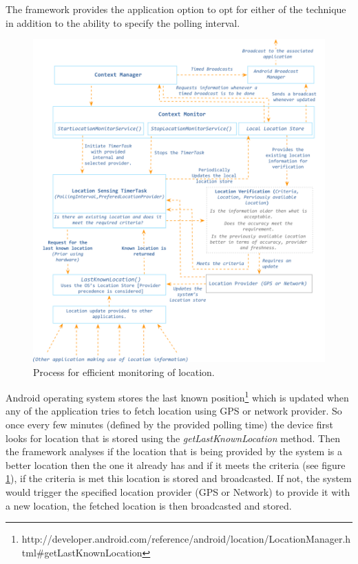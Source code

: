 \documentclass[12pt]{report}
\begin{document}
The framework provides the application option to opt for either of the technique in addition to the ability to specify the polling interval.

\begin{figure}[hbtp]
 \centering
 \includegraphics[width=160mm]{LocationSystemArch.png}
  \caption[Process for efficient monitoring of location.]{Process for efficient monitoring of location.}
 \label{figure:LocSysModel}
\end{figure}

Android operating system stores the last known position\footnote{http://developer.android.com/reference/android/location/LocationManager.html\#getLastKnownLocation} which is updated when any of the application tries to fetch location using GPS or network provider. So once every few minutes (defined by the provided polling time) the device first looks for location that is stored using the \textit{getLastKnownLocation} method. Then the framework analyses if the location that is being provided by the system is a better location then the one it already has and if it meets the criteria (see figure \ref{figure:LocSysModel}), if the criteria is met this location is stored and broadcasted. If not, the system would trigger the specified location provider (GPS or Network) to provide it with a new location, the fetched location is then broadcasted and stored.
\end{document}
